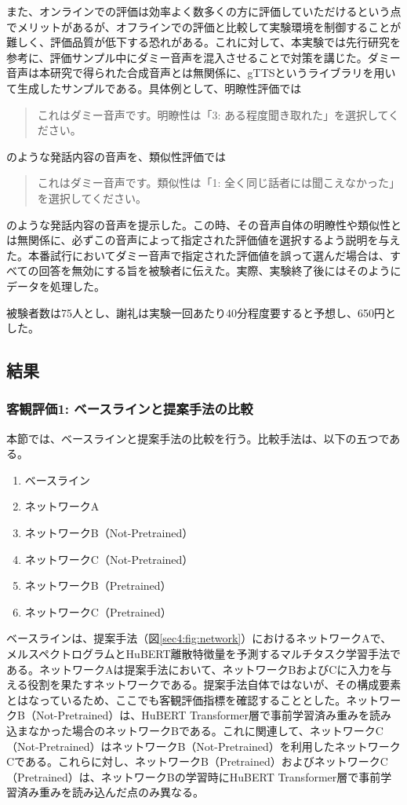 \documentclass[12pt]{jarticle}
\numberwithin{equation}{section}    %
\numberwithin{figure}{section}      %
\numberwithin{table}{section}      %
\begin{document}
また、オンラインでの評価は効率よく数多くの方に評価していただけるという点でメリットがあるが、オフラインでの評価と比較して実験環境を制御することが難しく、評価品質が低下する恐れがある。これに対して、本実験では先行研究\cite{kirkland2023stuck}を参考に、評価サンプル中にダミー音声を混入させることで対策を講じた。ダミー音声は本研究で得られた合成音声とは無関係に、gTTSというライブラリを用いて生成したサンプルである。具体例として、明瞭性評価では
\begin{quote}
    これはダミー音声です。明瞭性は「3: ある程度聞き取れた」を選択してください。
\end{quote}
のような発話内容の音声を、類似性評価では
\begin{quote}
    これはダミー音声です。類似性は「1: 全く同じ話者には聞こえなかった」を選択してください。
\end{quote}
のような発話内容の音声を提示した。この時、その音声自体の明瞭性や類似性とは無関係に、必ずこの音声によって指定された評価値を選択するよう説明を与えた。本番試行においてダミー音声で指定された評価値を誤って選んだ場合は、すべての回答を無効にする旨を被験者に伝えた。実際、実験終了後にはそのようにデータを処理した。

被験者数は75人とし、謝礼は実験一回あたり40分程度要すると予想し、650円とした。

\subsection{結果}
\subsubsection{客観評価1: ベースラインと提案手法の比較}
\label{sec4:sec:obj_1}
本節では、ベースラインと提案手法の比較を行う。比較手法は、以下の五つである。
\begin{enumerate}
    \item ベースライン
    \item ネットワークA
    \item ネットワークB（Not-Pretrained）
    \item ネットワークC（Not-Pretrained）
    \item ネットワークB（Pretrained）
    \item ネットワークC（Pretrained）
\end{enumerate}
ベースラインは、提案手法（図\ref{sec4:fig:network}）におけるネットワークAで、メルスペクトログラムとHuBERT離散特徴量を予測するマルチタスク学習手法である。ネットワークAは提案手法において、ネットワークBおよびCに入力を与える役割を果たすネットワークである。提案手法自体ではないが、その構成要素とはなっているため、ここでも客観評価指標を確認することとした。ネットワークB（Not-Pretrained）は、HuBERT Transformer層で事前学習済み重みを読み込まなかった場合のネットワークBである。これに関連して、ネットワークC（Not-Pretrained）はネットワークB（Not-Pretrained）を利用したネットワークCである。これらに対し、ネットワークB（Pretrained）およびネットワークC（Pretrained）は、ネットワークBの学習時にHuBERT Transformer層で事前学習済み重みを読み込んだ点のみ異なる。
\end{document}
